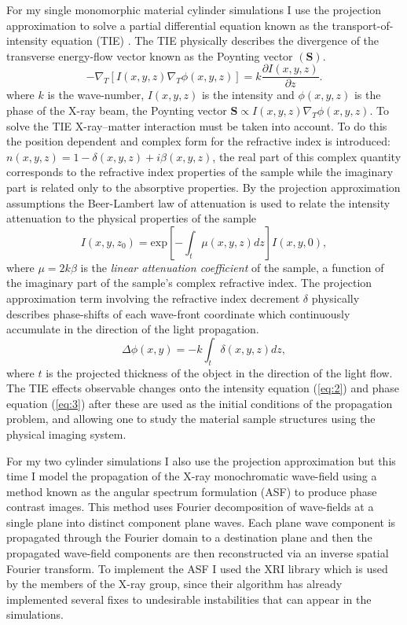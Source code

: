 \documentclass[9pt, a4paper]{article}
\begin{document}
For my single monomorphic material cylinder simulations I use the projection approximation to solve a partial differential equation known as the transport-of-intensity equation (TIE) . The TIE physically describes the divergence of the transverse energy-flow vector known as the Poynting vector $(\textbf{S})$\cite{PagsTutes}.
\begin{equation}\label{eq:1}
-\nabla_{T} [I(x, y, z) \nabla_{T} \phi(x, y, z)] = k \frac{\partial I (x, y, z)}{\partial z}.
\end{equation}
where $k$ is the wave-number, $I(x, y, z)$ is the intensity and $\phi(x, y, z)$ is the phase of the X-ray beam, the Poynting vector $\textbf{S} \propto I(x, y, z) \nabla_{T} \phi(x, y, z)$.
To solve the TIE X-ray--matter interaction must be taken into account. To do this the position dependent and complex form for the refractive index
is introduced: $n(x, y, z) = 1 - \delta(x, y, z) + i \beta(x, y, z)$, the real part of this complex quantity corresponds to the refractive index properties of the sample while the imaginary part is related only to the absorptive properties\cite{PagsTutes}.
By the projection approximation assumptions the Beer-Lambert law of attenuation is used to relate the intensity attenuation to the physical properties of the sample
\begin{equation}\label{eq:2}
I(x, y, z_0) = \mathrm{exp}[-\int_{t} \mu(x, y, z) dz] I(x, y, 0),
\end{equation}
where $\mu = 2k\beta$ is the \textit{linear attenuation coefficient} of the sample, a function of the imaginary part of the sample's complex refractive index.
The projection approximation term involving the refractive index decrement $\delta$ physically describes phase-shifts of each wave-front coordinate which continuously accumulate in the direction of the light propagation.
\begin{equation}\label{eq:3}
\Delta \phi(x, y) = -k \int_{t}\delta(x, y, z)dz,
\end{equation}
where $t$ is the projected thickness of the object in the direction of the light flow.
The TIE effects observable changes onto the intensity equation (\ref{eq:2}) and phase equation (\ref{eq:3}) after these are used as the initial conditions of the propagation problem, and allowing one to study the material sample structures using the physical imaging system. 

For my two cylinder simulations I also use the projection approximation but this time I model the propagation of the X-ray monochromatic wave-field using a method known as the angular spectrum formulation (ASF) to produce phase contrast images. This method uses Fourier decomposition of wave-fields at a single plane into distinct component plane waves. Each plane wave component is propagated through the Fourier domain to a destination plane and then the propagated wave-field components are then reconstructed via an inverse spatial Fourier transform\cite{Goodman}. To implement the ASF I used the XRI library which is used by the members of the X-ray group, since their algorithm has already implemented several fixes to undesirable instabilities that can appear in the simulations. 
\end{document}
